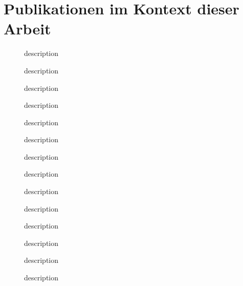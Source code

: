 \chapter*{Publikationen im Kontext dieser Arbeit}

\begin{description}
	\item[\citet{Oppl05a}] description
	\item[\citet{Oppl06}] description
	\item[\citet{Oppl06a}] description 
	\item[\citet{Oppl07b}] description
	\item[\citet{Oppl07}] description
	\item[\citet{Oppl07a}] description
	\item[\citet{Furtmuller07a}] description
	\item[\citet{Oppl08}] description
	\item[\citet{Oppl08a}] description
	\item[\citet{Oppl09}] description
	\item[\citet{Oppl09a}] description
	\item[\citet{Oppl09b}] description
	\item[\citet{Oppl09c}] description
	\item[\citet{Oppl09d}] description
\end{description}
